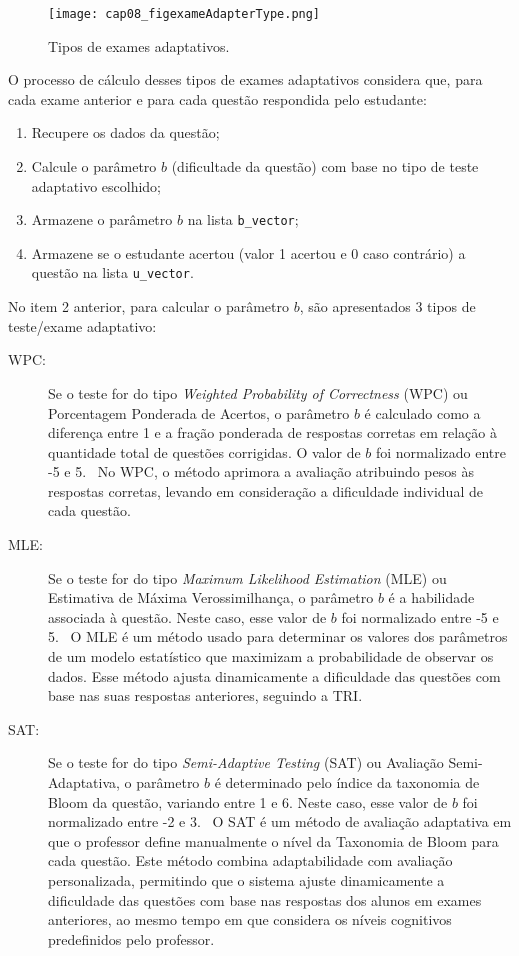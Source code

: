 \begin{figure}[!ht]
  \centering
  \texttt{[image: cap08\_figexameAdapterType.png]}
   \caption{Tipos de exames adaptativos.}
\label{fig:cap08_figexameAdapterType}
\end{figure}

O processo de cálculo desses tipos de exames adaptativos considera que, para cada exame anterior e para cada questão respondida pelo estudante:

\begin{enumerate}
    \item Recupere os dados da questão;
    \item Calcule o parâmetro $b$ (dificultade da questão) com base no tipo de teste adaptativo escolhido;
    \item Armazene o parâmetro $b$ na lista \verb|b_vector|;
    \item Armazene se o estudante acertou (valor 1 acertou e 0 caso contrário) a questão na lista \verb|u_vector|.
\end{enumerate}

No item 2 anterior, para calcular o parâmetro $b$, são apresentados 3 tipos de teste/exame adaptativo:

\begin{description}
  \item[WPC:] Se o teste for do tipo \textit{Weighted Probability of Correctness} (WPC) ou Porcentagem Ponderada de Acertos, o parâmetro $b$ é calculado como a diferença entre 1 e a fração ponderada de respostas corretas em relação à quantidade total de questões corrigidas. O valor de $b$ foi normalizado entre -5 e 5.
  \
  No WPC, o método aprimora a avaliação atribuindo pesos às respostas corretas, levando em consideração a dificuldade individual de cada questão. 
  
  \item[MLE:] Se o teste for do tipo \textit{Maximum Likelihood Estimation} (MLE) ou Estimativa de Máxima Verossimilhança, o parâmetro $b$ é a habilidade associada à questão. Neste caso, esse valor de $b$ foi normalizado entre -5 e 5.
  \
  O MLE é um método usado para determinar os valores dos parâmetros de um modelo estatístico que maximizam a probabilidade de observar os dados. Esse método ajusta dinamicamente a dificuldade das questões com base nas suas respostas anteriores, seguindo a TRI.
  
  \item[SAT:] Se o teste for do tipo \textit{Semi-Adaptive Testing} (SAT) ou Avaliação Semi-Adaptativa, o parâmetro $b$ é determinado pelo índice da taxonomia de Bloom da questão, variando entre 1 e 6. Neste caso, esse valor de $b$ foi normalizado entre -2 e 3.
  \
  O SAT é um método de avaliação adaptativa em que o professor define manualmente o nível da Taxonomia de Bloom para cada questão. Este método combina adaptabilidade com avaliação personalizada, permitindo que o sistema ajuste dinamicamente a dificuldade das questões com base nas respostas dos alunos em exames anteriores, ao mesmo tempo em que considera os níveis cognitivos predefinidos pelo professor.
\end{description}

